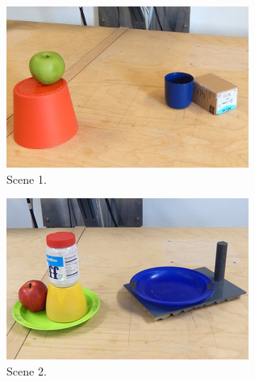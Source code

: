\begin{figure}
  \begin{subfigure}[]{0.32\textwidth}
    \includegraphics[width=\textwidth]{./figures/sec/scene_photos/affordance_scene4_wide.jpg}
    \caption{Scene 1.}
    \label{fig:sec_enriched_geometricalreasoning_experiments_scenesexample_scenes1}
  \end{subfigure}
  \hfill
  \begin{subfigure}[]{0.32\textwidth}
    \includegraphics[width=\textwidth]{./figures/sec/scene_photos/affordance_scene7_wide.jpg}
    \caption{Scene 2.}
    \label{fig:sec_enriched_geometricalreasoning_experiments_scenesexample_scenes2}
  \end{subfigure}
  \hfill
  \begin{subfigure}[]{0.32\textwidth}

\end{subfigure}
\end{figure}
